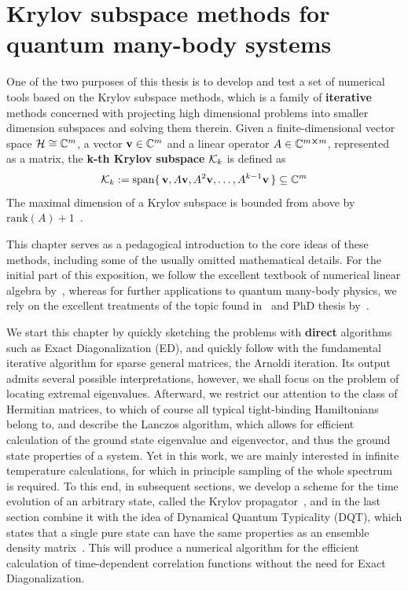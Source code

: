 
\chapter{Krylov subspace methods for quantum many-body systems\label{chap:krylov}}
\thispagestyle{chapterBeginStyle}

One of the two purposes of this thesis is to develop and test a set of numerical tools based on the Krylov subspace methods,
which is a family of \textbf{iterative} methods concerned with projecting high dimensional problems into smaller dimension subspaces
and solving them therein. Given a finite-dimensional vector space \(\mathcal{H} \cong \mathbb{C}^m \), a vector \(\vectorbold{v}\in \CC^m\) and
a linear operator \(A\in\mathbb{C}^{m\cross m}\), represented as a matrix, the \textbf{k-th Krylov subspace} \(\mathcal{K}_{k}\) is defined as 
\begin{equation}
		\K{k} := \mathrm{span}\{\,\vectorbold{v}, A\vectorbold{v}, A^2\vectorbold{v},\ldots,A^{k-1}\vectorbold{v} \,\} \subseteq \CC^m
	\label{def:krylov}
\end{equation}
The maximal dimension of a Krylov subspace is bounded from above by \(\mathrm{rank}(A) + 1\)~\autocite{Simoncini2015}.

This chapter serves as a pedagogical introduction to the core ideas of these methods, including some of the usually omitted mathematical details.
For the initial part of this exposition, we follow the excellent textbook of numerical linear algebra by~\textcite{Trefethen1997},
whereas for further applications to quantum many-body physics, we rely on the excellent treatments of the topic
found in~\textcite{Sandvik2010} and PhD thesis by~\textcite{Crivelli2016}.

We start this chapter by quickly sketching the problems with \textbf{direct} algorithms such as Exact Diagonalization (ED), and quickly
follow with the fundamental iterative algorithm for sparse general matrices, the Arnoldi iteration. Its output admits several
possible interpretations, however, we shall focus on the problem of locating extremal eigenvalues.
Afterward, we restrict our attention to the class of Hermitian matrices, to which of course all typical tight-binding Hamiltonians
belong to, and describe the Lanczos algorithm, which allows for efficient calculation of the ground state eigenvalue and eigenvector,
and thus the ground state properties of a system.
Yet in this work, we are mainly interested in infinite temperature calculations, for which in principle sampling of the whole
spectrum is required. To this end, in subsequent sections, we develop a scheme for the time evolution of an arbitrary state,
called the Krylov propagator~\autocite{Park1986}, and in the last section combine it with the idea of Dynamical Quantum Typicality (DQT),
which states that a single pure state can have the same properties as an ensemble density matrix~\autocite{Gemmer2003, Goldstein2006, Popescu2006}.
This will produce a numerical algorithm for the efficient calculation of time-dependent correlation functions without the need
for Exact Diagonalization.

